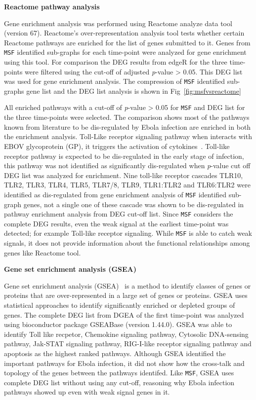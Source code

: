 \documentclass[10pt,a4paper,twocolumn]{article}
\begin{document}
	\textbf{Reactome pathway analysis}
	
	Gene enrichment analysis was performed using Reactome analyze data
	tool~\cite{Reactome} (version 67). Reactome's over-representation analysis tool tests whether
	certain Reactome pathways are enriched for the list of genes submitted to it. Genes from \texttt{MSF} identified
	sub-graphs for each time-point were analyzed for gene enrichment using this tool.  For
	comparison the DEG results from edgeR for the three time-points were filtered using the cut-off of
	adjusted \textit{p}-value > 0.05. This DEG list was used for gene
	enrichment analysis. The compression of \texttt{MSF} identified sub-graphs gene list and the DEG list analysis is shown in Fig~\ref{fig:msfvsreactome}
	
	All enriched pathways with a cut-off of \textit{p}-value > 0.05 for \texttt{MSF} and DEG list for the three time-points were selected. The comparison shows most of the pathways known from literature
	to be dis-regulated by Ebola infection are enriched in both the enrichment
	analysis. Toll-Like receptor signaling pathway when interacts with EBOV
	glycoprotein (GP), it triggers the activation of
	cytokines~\cite{Olejnik}. Toll-like receptor pathway is expected to be dis-regulated in the early stage of infection, this pathway was not identified as significantly dis-regulated when \textit{p}-value
	cut off DEG list was analyzed for enrichment. Nine toll-like receptor cascades TLR10, TLR2, TLR3, TLR4, TLR5, TLR7/8, TLR9, TLR1:TLR2 and TLR6:TLR2 were identified as dis-regulated from gene enrichment analysis of \texttt{MSF} identified sub-graph genes, not a single one of these cascade was shown to be dis-regulated in pathway enrichment analysis from DEG cut-off list. Since \texttt{MSF}
	considers the complete DEG results, even the weak signal at the earliest
	time-point was detected; for example Toll-like receptor signaling. While \texttt{MSF} is able to catch weak signals, it does not provide information about the functional relationships among genes like Reactome tool. 
	
	\textbf{Gene set enrichment analysis (GSEA)}
	
	Gene set enrichment analysis (GSEA)~\cite{Subramanian15545} is a method to identify classes of genes or proteins that are over-represented in a large set of genes or proteins. GSEA uses statistical approaches to identify significantly enriched or depleted groups of genes. The complete DEG list from DGEA of the first time-point was analyzed using bioconductor package GSEABase (version 1.44.0). GSEA was able to identify Toll like recpetor, Chemokine signaling pathway, Cytosolic DNA-sensing pathway, Jak-STAT signaling pathway, RIG-I-like receptor signaling pathway and apoptosis as the highest ranked pathways. Although GSEA identified the important pathways for Ebola infection, it did not show how the cross-talk and topology of the genes between the pathways identifed. Like \texttt{MSF}, GSEA uses complete DEG list without using any cut-off, reasoning why Ebola infection pathways showed up even with weak signal genes in it.
	
\end{document}
